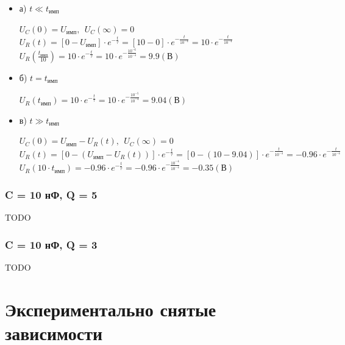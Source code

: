 \begin{itemize}
\item[] а) $t \ll t_\text{имп}$

		$U_C(0)	= U_\text{имп},\ \ U_C(\infty) = 0$\\		
		$U_R(t) = [0 - U_\text{имп}] \cdot e^{-\frac{t}{\tau}} = [10 - 0] \cdot e^{-\frac{t}{10^{-4}}} = 10 \cdot e^{-\frac{t}{10^{-4}}}$\\
		$U_R(\frac{t_\text{имп}}{10}) = 10 \cdot e^{-\frac{t}{\tau}} = 10 \cdot e^{-\frac{10^{-6}}{10^{-4}}} = 9.9 (\text{В})$\\

\item[] б) $t = t_\text{имп}$

		$U_R(t_\text{имп}) = 10 \cdot e^{-\frac{t}{\tau}} = 10 \cdot e^{-\frac{10^{-5}}{10^{-4}}} = 9.04 (\text{В})$\\
	
\item[] в) $t \gg t_\text{имп}$

		$U_C(0)	= U_\text{имп} - U_R(t),\ \ U_C(\infty) = 0$\\
		$U_R(t) = [0 - (U_\text{имп} - U_R(t))] \cdot e^{-\frac{t}{\tau}} = [0 - (10 - 9.04)] \cdot e^{-\frac{t}{10^{-4}}} = -0.96 \cdot e^{-\frac{t}{10^{-4}}}$\\
		$U_R(10 \cdot t_\text{имп}) = -0.96 \cdot e^{-\frac{t}{\tau}} = -0.96 \cdot e^{-\frac{10^{-4}}{10^{-4}}} = -0.35 (\text{В})$\\
\end{itemize}

\subsubsection{C = 10 нФ, Q = 5}
TODO

\subsubsection{C = 10 нФ, Q = 3}
TODO

\section{Экспериментально снятые зависимости}

